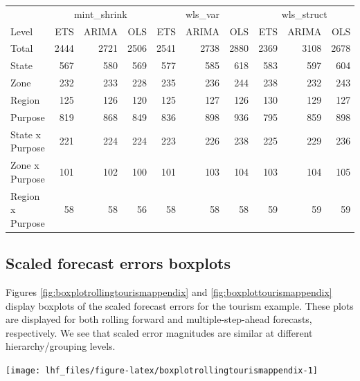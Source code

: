 \documentclass[11pt,a4paper,]{article}
\let\origfigure\figure
\let\endorigfigure\endfigure
\renewenvironment{figure}[1][2] {
    \expandafter\origfigure\expandafter[!htbp]
} {
    \endorigfigure
}
\let\origtable\table
\let\endorigtable\endtable
\renewenvironment{table}[1][2] {
    \expandafter\origtable\expandafter[!htbp]
} {
    \endorigtable
}
\begin{document}
\begin{table}

\caption{\label{tab:Tourismdatadifrecfix}Comparing Mean(RMSE) of three   different reconciliation matrices for fixed origin forecasts on a 24 months test set.}
\centering
\begin{tabular}[t]{lrrrrrrrrr}
\toprule
\multicolumn{1}{c}{} & \multicolumn{3}{c}{mint\_shrink} & \multicolumn{3}{c}{wls\_var} & \multicolumn{3}{c}{wls\_struct} \\
\cmidrule(l{3pt}r{3pt}){2-4} \cmidrule(l{3pt}r{3pt}){5-7} \cmidrule(l{3pt}r{3pt}){8-10}
Level & ETS & ARIMA & OLS & ETS & ARIMA & OLS & ETS & ARIMA & OLS\\
\midrule
Total & 2444 & 2721 & 2506 & 2541 & 2738 & 2880 & 2369 & 3108 & 2678\\
State & 567 & 580 & 569 & 577 & 585 & 618 & 583 & 597 & 604\\
Zone & 232 & 233 & 228 & 235 & 236 & 244 & 238 & 232 & 243\\
Region & 125 & 126 & 120 & 125 & 127 & 126 & 130 & 129 & 127\\
Purpose & 819 & 868 & 849 & 836 & 898 & 936 & 795 & 859 & 898\\
State x Purpose & 221 & 224 & 224 & 223 & 226 & 238 & 225 & 229 & 236\\
Zone x Purpose & 101 & 102 & 100 & 101 & 103 & 104 & 103 & 104 & 105\\
Region x Purpose & 58 & 58 & 56 & 58 & 58 & 58 & 59 & 59 & 59\\
\bottomrule
\end{tabular}
\end{table}

\hypertarget{scaled-forecast-errors-boxplots}{%
\subsection{Scaled forecast errors boxplots}\label{scaled-forecast-errors-boxplots}}

Figures \ref{fig:boxplotrollingtourismappendix} and \ref{fig:boxplottourismappendix} display boxplots of the scaled forecast errors for the tourism example. These plots are displayed for both rolling forward and multiple-step-ahead forecasts, respectively. We see that scaled error magnitudes are similar at different hierarchy/grouping levels.

\begin{figure}

{\centering \texttt{[image: lhf\_files/figure-latex/boxplotrollingtourismappendix-1]} 

}

\caption{Box plots of scaled forecast errors from reconciled and unreconciled ETS, ARIMA, and OLS rolling origin forecasts for tourism demand data. Panels are different hierarchy levels.}\label{fig:boxplotrollingtourismappendix}
\end{figure}
\end{document}
